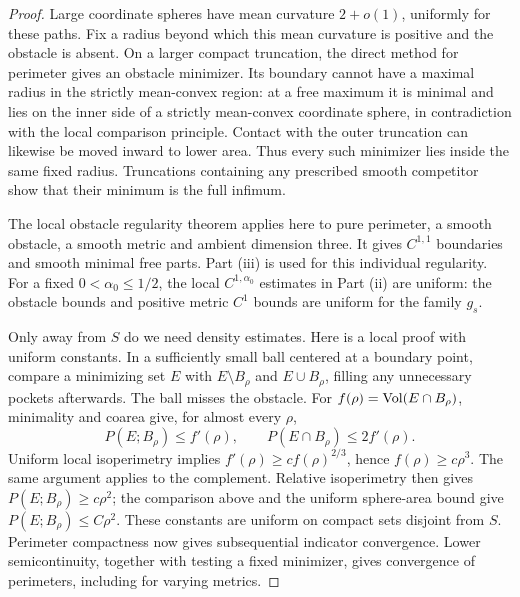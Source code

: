 \begin{proof}
Large coordinate spheres have mean curvature \(2+o(1)\), uniformly for
these paths.  Fix a radius beyond which this mean curvature is positive
and the obstacle is absent.  On a larger compact truncation, the
direct method for perimeter gives an obstacle minimizer.  Its boundary
cannot have a maximal radius in the strictly mean-convex region: at a
free maximum it is minimal and lies on the inner side of a strictly
mean-convex coordinate sphere, in contradiction with the local
comparison principle.  Contact with the outer truncation can likewise
be moved inward to lower area.  Thus every such minimizer lies inside
the same fixed radius.  Truncations containing any prescribed smooth
competitor show that their minimum is the full infimum.

The local obstacle regularity theorem
\cite[Regularity Theorem~1.3(iii)]{huiskenilmanen2001} applies here to
pure perimeter, a smooth obstacle, a smooth metric and ambient
dimension three.  It gives \(C^{1,1}\) boundaries and smooth minimal
free parts. Part (iii) is used for this individual regularity.
For a fixed \(0<\alpha_0\le1/2\), the local \(C^{1,\alpha_0}\)
estimates in Part (ii) are uniform: the obstacle bounds and positive
metric \(C^1\) bounds are uniform for the family \(g_s\).

Only away from \(S\) do we need density estimates. Here is a local
proof with uniform constants. In a sufficiently small ball centered
at a boundary point, compare a minimizing set \(E\) with
\(E\setminus B_\rho\) and \(E\cup B_\rho\), filling any unnecessary
pockets afterwards. The ball misses the obstacle. For
\(f(\rho)=\operatorname{Vol}(E\cap B_\rho)\), minimality and coarea give, for
almost every \(\rho\),
\[
 P(E;B_\rho)\le f'(\rho),\qquad
 P(E\cap B_\rho)\le2f'(\rho).
\]
Uniform local isoperimetry implies
\(f'(\rho)\ge c f(\rho)^{2/3}\), hence
\(f(\rho)\ge c\rho^3\). The same argument applies to the complement.
Relative isoperimetry then gives
\(P(E;B_\rho)\ge c\rho^2\); the comparison above and the uniform
sphere-area bound give \(P(E;B_\rho)\le C\rho^2\).
These constants are uniform on compact sets disjoint from \(S\).
Perimeter compactness now gives subsequential indicator convergence.  Lower
semicontinuity, together with testing a fixed minimizer, gives
convergence of perimeters, including for varying metrics.


\end{proof}
